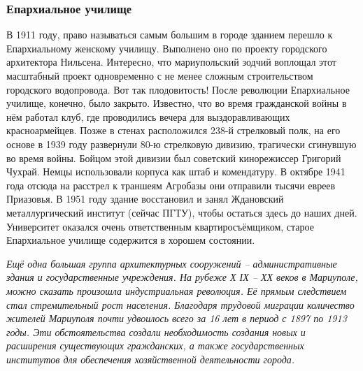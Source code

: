  
 
 
 
 

\subsubsection{Епархиальное училище}

В 1911 году, право называться самым большим в городе зданием перешло к
Епархиальному женскому училищу. Выполнено оно по проекту городского архитектора
Нильсена. Интересно, что мариупольский зодчий воплощал этот масштабный проект
одновременно с не менее сложным строительством городского водопровода. Вот так
плодовитость! После революции Епархиальное училище, конечно, было закрыто.
Известно, что во время гражданской войны в нём работал клуб, где проводились
вечера для выздоравливающих красноармейцев. Позже в стенах расположился 238-й
стрелковый полк, на его основе в 1939 году развернули 80-ю стрелковую дивизию,
трагически сгинувшую во время войны. Бойцом этой дивизии был советский
кинорежиссер Григорий Чухрай. Немцы использовали корпуса как штаб и
комендатуру. В октябре 1941 года отсюда на расстрел к траншеям Агробазы они
отправили тысячи евреев Приазовья. В 1951 году здание восстановил и занял
Ждановский металлургический институт (сейчас ПГТУ), чтобы остаться здесь до
наших дней. Университет оказался очень ответственным квартиросъёмщиком, старое
Епархиальное училище содержится в хорошем состоянии.


\emph{Ещё одна большая группа архитектурных сооружений – административные здания и
государственные учреждения. На рубеже Х ІХ – ХХ веков в Мариуполе, можно
сказать произошла индустриальная революция. Её прямым следствием стал
стремительный рост населения. Благодаря трудовой миграции количество жителей
Мариуполя почти удвоилось всего за 16 лет в период с 1897 по 1913 годы. Эти
обстоятельства создали необходимость создания новых и расширения существующих
гражданских, а также государственных институтов для обеспечения хозяйственной
деятельности города.}

